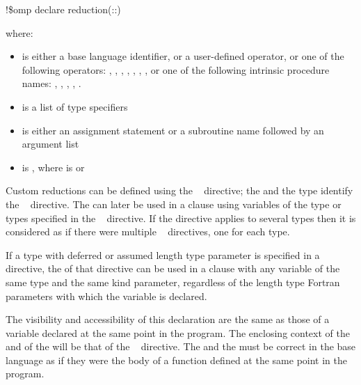 {{{{\fortranspecificstart
\begin{boxedcode}
!\$omp declare reduction(::) 
\end{boxedcode}

where:

\begin{itemize}
\item {} is either a base language identifier, or a user-defined operator, or 
one of the following operators: 
\code{+}, 
\code{-}, 
\code{*}, 
, 
, 
, 
, or one of the following intrinsic procedure names: 
, 
, 
, 
, 
. 

\item {} is a list of type specifiers 

\item {} is either an assignment statement or a subroutine name followed by an 
argument list 

\item {} is \code{)}, 
where  is\linebreak
{} or \code{(}\code{)}
\end{itemize}
\fortranspecificend

\descr
Custom reductions can be defined using the ~ directive; the 
 and the type identify the ~ directive. The 
 can later be used in a  clause using variables of the 
type or types specified in the ~ directive. If the directive applies 
to several types then it is considered as if there were multiple ~ 
directives, one for each type.

\fortranspecificstart
If a type with deferred or assumed length type parameter is specified in a ~ directive, the  of that directive can be used in a  clause with any variable of the same type and the same kind parameter, regardless of the length type Fortran parameters with which the variable is declared.
\fortranspecificend

The visibility and accessibility of this declaration are the same as those of a variable 
declared at the same point in the program. The enclosing context of the  and of 
the  will be that of the ~ directive. The  
and the  must be correct in the base language as if they were the body of 
a function defined at the same point in the program.

}}}}
